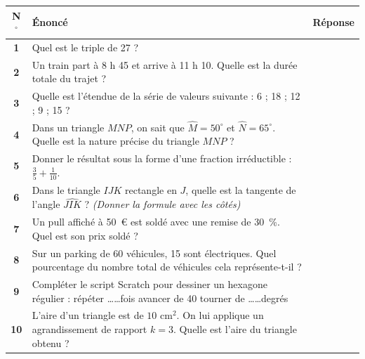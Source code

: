 \documentclass[a4paper,11pt]{article}
\begin{document}
\noindent
\begin{tabularx}{\textwidth}{|c|X|p{4cm}|}
\hline
\textbf{N$^{\circ}$} & \textbf{Énoncé} & \textbf{Réponse} \\ \hline
\textbf{1} & Quel est le triple de 27 ? & \\ \hline
\textbf{2} & Un train part à 8 h 45 et arrive à 11 h 10. Quelle est la durée totale du trajet ? & \\ \hline
\textbf{3} & Quelle est l'étendue de la série de valeurs suivante : 6 ; 18 ; 12 ; 9 ; 15 ? & \\ \hline
\textbf{4} & Dans un triangle $MNP$, on sait que $\widehat{M} = 50^{\circ}$ et $\widehat{N} = 65^{\circ}$. Quelle est la nature précise du triangle $MNP$ ? & \\ \hline
\textbf{5} & Donner le résultat sous la forme d'une fraction irréductible : $\frac{3}{5} + \frac{1}{10}$. & \\ \hline
\textbf{6} & Dans le triangle $IJK$ rectangle en $J$, quelle est la tangente de l'angle $\widehat{JIK}$ ? \textit{(Donner la formule avec les côtés)} & \\ \hline
\textbf{7} & Un pull affiché à 50~€ est soldé avec une remise de 30~\%. Quel est son prix soldé ? & \\ \hline
\textbf{8} & Sur un parking de 60 véhicules, 15 sont électriques. Quel pourcentage du nombre total de véhicules cela représente-t-il ? & \\ \hline
\textbf{9} & Compléter le script Scratch pour dessiner un hexagone régulier : \newline répéter \dots\dots fois \newline \hspace*{0.5cm} avancer de 40 \newline \hspace*{0.5cm} tourner de \dots\dots degrés & \\ \hline
\textbf{10} & L'aire d'un triangle est de $10\text{ cm}^2$. On lui applique un agrandissement de rapport $k = 3$. Quelle est l'aire du triangle obtenu ? & \\ \hline
\end{tabularx}

\newpage
\end{document}
